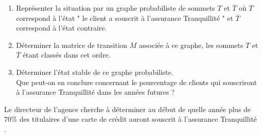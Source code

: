 %
%
\par
\begin{enumerate}
     \item %
     Représenter la situation par un graphe probabiliste de sommets $T$ et $\overline{T}$ où $T$ correspond à l'état " le client a souscrit à l'assurance \og Tranquillité \fg{} " et $\overline{T}$ correspond à l'état contraire.
     \item %
     Déterminer la matrice de transition $M$ associée à ce graphe, les sommets $T$ et $\overline{T}$ étant classés dans cet ordre.
     \item %
     Déterminer l'état stable de ce graphe probabiliste. \\
     Que peut-on en conclure concernant le pourcentage de clients qui souscriront à l'assurance \og Tranquillité \fg{} dans les années futures ?
     \par
\end{enumerate}
\par
%
%
\par
Le directeur de l'agence cherche à déterminer au début de quelle année plus de 70\% des titulaires d'une carte de crédit auront souscrit à l'assurance \og Tranquillité \fg{}.
\par

